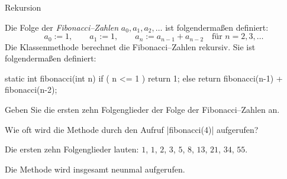 \begin{exercise}{Rekursion}
\begin{body}
Die Folge der \emph{Fibonacci--Zahlen} $a_0, a_1, a_2, \dotsc$ ist folgenderma\ss en definiert:
\begin{equation*}
a_0 := 1,\qquad
a_1 := 1,\qquad
a_n := a_{n-1} + a_{n-2}\quad\text{für } n = 2,3,\dotsc
\end{equation*}
Die Klassenmethode  berechnet die Fibonacci--Zahlen rekursiv.
Sie ist folgenderma\ss en definiert:
\begin{displaycode}
    static int fibonacci(int n) {
        if ( n <= 1 ) {
            return 1;
        } else {
            return fibonacci(n-1) + fibonacci(n-2);
        }
    }
\end{displaycode}
\begin{parts}
\item Geben Sie die ersten zehn Folgenglieder der Folge der Fibonacci--Zahlen an.
\item Wie oft wird die Methode durch den Aufruf \code|fibonacci(4)| aufgerufen?
\end{parts}
\end{body}

\begin{solution}
\begin{parts}
\item
Die ersten zehn Folgenglieder lauten: $1$, $1$, $2$, $3$, $5$, $8$, $13$, $21$, $34$, $55$.

\item
Die Methode wird insgesamt neunmal aufgerufen.

\end{parts}
\end{solution}
\end{exercise}
